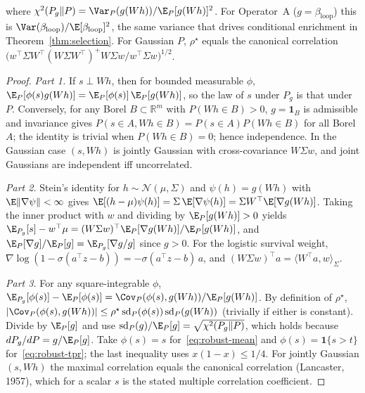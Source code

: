 \begin{theorem}
\begin{enumerate}
\begin{align}
  \end{align}
  where $\chi^2(P_g \| P) = \Var_P(g(Wh)) / \E_P[g(Wh)]^2$. For Operator~A ($g = \beta_{\mathrm{loop}}$) this is $\Var(\beta_{\mathrm{loop}})/\E[\beta_{\mathrm{loop}}]^2$, the same variance that drives conditional enrichment in Theorem~\ref{thm:selection}. For Gaussian $P$, $\rho^\star$ equals the canonical correlation $\big(w^\top \Sigma W^\top (W\Sigma W^\top)^{+} W \Sigma w / w^\top \Sigma w\big)^{1/2}$.
\end{enumerate}
\end{theorem}

\begin{proof}
\emph{Part 1.} If $s \perp Wh$, then for bounded measurable $\phi$, $\E_P[\phi(s) g(Wh)] = \E_P[\phi(s)]\,\E_P[g(Wh)]$, so the law of $s$ under $P_g$ is that under $P$. Conversely, for any Borel $B \subset \mathbb{R}^m$ with $P(Wh \in B) > 0$, $g = \mathbf{1}_B$ is admissible and invariance gives $P(s \in A, Wh \in B) = P(s \in A) P(Wh \in B)$ for all Borel $A$; the identity is trivial when $P(Wh \in B) = 0$; hence independence. In the Gaussian case $(s, Wh)$ is jointly Gaussian with cross-covariance $W \Sigma w$, and joint Gaussians are independent iff uncorrelated.

\emph{Part 2.} Stein's identity for $h \sim \mathcal{N}(\mu, \Sigma)$ and $\psi(h) = g(Wh)$ with $\E\|\nabla\psi\| < \infty$ gives $\E[(h - \mu)\psi(h)] = \Sigma\, \E[\nabla \psi(h)] = \Sigma W^\top \E[\nabla g(Wh)]$. Taking the inner product with $w$ and dividing by $\E_P[g(Wh)] > 0$ yields $\E_{P_g}[s] - w^\top \mu = (W\Sigma w)^\top \E_P[\nabla g(Wh)]/\E_P[g(Wh)]$, and $\E_P[\nabla g]/\E_P[g] = \E_{P_g}[\nabla g / g]$ since $g > 0$. For the logistic survival weight, $\nabla \log(1 - \sigma(a^\top z - b)) = -\sigma(a^\top z - b)\, a$, and $(W \Sigma w)^\top a = \langle W^\top a, w\rangle_\Sigma$.

\emph{Part 3.} For any square-integrable $\phi$, $\E_{P_g}[\phi(s)] - \E_P[\phi(s)] = \Cov_P(\phi(s), g(Wh)) / \E_P[g(Wh)]$. By definition of $\rho^\star$, $|\Cov_P(\phi(s), g(Wh))| \le \rho^\star \operatorname{sd}_P(\phi(s))\operatorname{sd}_P(g(Wh))$ (trivially if either is constant). Divide by $\E_P[g]$ and use $\operatorname{sd}_P(g)/\E_P[g] = \sqrt{\chi^2(P_g\|P)}$, which holds because $dP_g/dP = g/\E_P[g]$. Take $\phi(s) = s$ for~\eqref{eq:robust-mean} and $\phi(s) = \mathbf{1}\{s > t\}$ for~\eqref{eq:robust-tpr}; the last inequality uses $x(1-x) \le 1/4$. For jointly Gaussian $(s, Wh)$ the maximal correlation equals the canonical correlation (Lancaster, 1957), which for a scalar $s$ is the stated multiple correlation coefficient.
\end{proof}

